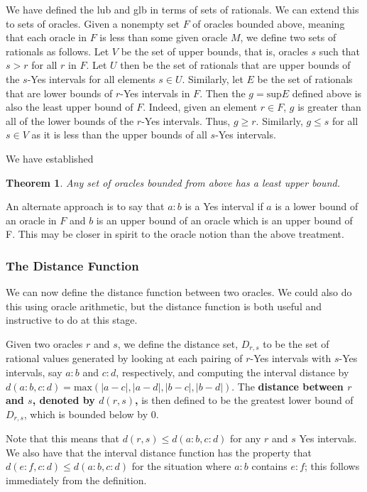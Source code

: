\documentclass[12pt]{article}
\newtheorem{theorem}{Theorem}
\theoremstyle{remark}
\begin{document}
We have defined the lub and glb in terms of sets of rationals. We can extend this to sets of oracles. Given a nonempty set $F$ of oracles bounded above, meaning that each oracle in $F$ is less than some given oracle $M$, we define two sets of rationals as follows. Let $V$ be the set of upper bounds, that is, oracles $s$ such that $s > r$ for all $r$ in $F$. Let $U$ then be the set of rationals that are upper bounds of the $s$-Yes intervals for all elements $s \in U$. Similarly, let $E$ be the set of rationals that are lower bounds of $r$-Yes intervals in $F$. Then the $g = \mathrm{sup} E$ defined above is also the least upper bound of $F$.  Indeed, given an element $r \in F$, $g$ is greater than all of the lower bounds of the $r$-Yes intervals. Thus, $g \geq r$. Similarly, $g \leq s$ for all $s \in V$ as it is less than the upper bounds of all $s$-Yes intervals. 

We have established

\begin{theorem}\label{th:lub}
Any set of oracles bounded from above has a least upper bound. 
\end{theorem}

An alternate approach is to say that $a:b$ is a Yes interval if $a$ is a lower bound of an oracle in $F$ and $b$ is an upper bound of an oracle which is an upper bound of F. This may be closer in spirit to the oracle notion than the above treatment. 

\subsubsection{The Distance Function}

We can now define the distance function between two oracles. We could also do this using oracle arithmetic, but the distance function is both useful and instructive to do at this stage. 

Given two oracles $r$ and $s$, we define the distance set, $D_{r,s}$ to be the set of rational values generated by looking at each pairing of $r$-Yes intervals with $s$-Yes intervals, say  $a:b$ and $c:d$, respectively, and computing the interval distance by $d(a:b,c:d) = \mathrm{max}(|a-c|, |a-d|,|b-c|,|b-d|)$. The \textbf{distance between $r$ and $s$, denoted by $d(r,s)$,} is then defined to be the greatest lower bound of $D_{r,s}$, which is bounded below by 0. 

Note that this means that $d(r,s) \leq d(a:b, c:d)$ for any $r$ and $s$ Yes intervals. We also have that the interval distance function has the property that $d(e:f, c:d) \leq d(a:b, c:d)$ for the situation where $a:b$ contains $e:f$; this follows immediately from the definition. 
\end{document}
